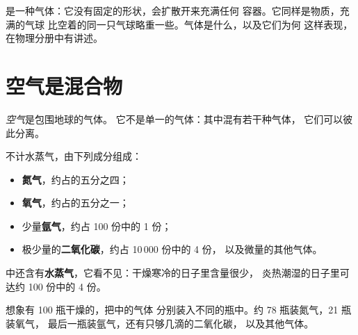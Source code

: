 \begin{remark}[空气是一种气体]\label{rem:g4:air-a-mixture-of-gases:gas}
是一种气体：它没有固定的形状，会扩散开来充满任何
容器。它同样是物质，充满的气球
比空着的同一只气球略重一些。气体是什么，以及它们为何
这样表现，在物理分册中有讲述。
\end{remark}

\section{空气是混合物}

\begin{definition}[空气]\label{def:g4:air-a-mixture-of-gases:air}
\emph{空气}是包围地球的气体。
它不是单一的气体：其中混有若干种气体，
它们可以彼此分离。
\end{definition}

\begin{proposition}[空气的组成]\label{prop:g4:air-a-mixture-of-gases:composition}
不计水蒸气，由下列成分组成：
\begin{itemize}
  \item \textbf{氮气}，约占的五分之四；
  \item \textbf{氧气}，约占的五分之一；
  \item 少量\textbf{氩气}，约占 100 份中的 1 份；
  \item 极少量的\textbf{二氧化碳}，约占 10\,000 份中的 4 份，
        以及微量的其他气体。
\end{itemize}
中还含有\textbf{水蒸气}，它看不见：干燥寒冷的日子里含量很少，
炎热潮湿的日子里可达约 100 份中的 4 份。
\end{proposition}

\begin{example}[一百瓶空气]\label{ex:g4:air-a-mixture-of-gases:hundred}
想象有 100 瓶干燥的，把中的气体
分别装入不同的瓶中。约 78 瓶装氮气，21 瓶装氧气，
最后一瓶装氩气，还有只够几滴的二氧化碳，
以及其他气体。
\end{example}

